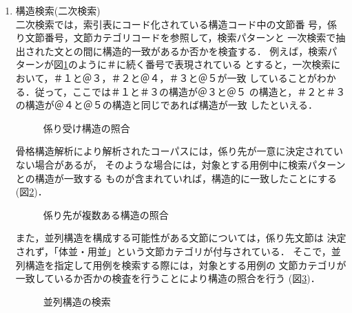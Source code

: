 \begin{enumerate}
\item{構造検索(二次検索)} \\
二次検索では，索引表にコード化されている構造コード中の文節番
号，係り文節番号，文節カテゴリコードを参照して，検索パターンと
一次検索で抽出された文との間に構造的一致があるか否かを検査する．
例えば，検索パターンが図\ref{struct}のように＃に続く番号で表現されている
とすると，一次検索において，＃１と＠３，＃２と＠４，＃３と＠５が一致
していることがわかる．従って，ここでは＃１と＃３の構造が＠３と＠５
の構造と，＃２と＃３の構造が＠４と＠５の構造と同じであれば構造が一致
したといえる．

\begin{figure}[htb]
\begin{center}
\vspace{-2mm}
  
\caption{係り受け構造の照合}
\vspace{-3mm}
\label{struct}
\end{center}
\end{figure}

骨格構造解析により解析されたコーパスには，係り先が一意に決定されていない場合があるが，
そのような場合には，対象とする用例中に検索パターンとの構造が一致する
ものが含まれていれば，構造的に一致したことにする(図\ref{aimai})．

\begin{figure}[htb]
\begin{center}
\vspace{-2mm}
  
\caption{係り先が複数ある構造の照合}
\vspace{-3mm}
\label{aimai}
\end{center}
\end{figure}

また，並列構造を構成する可能性がある文節については，係り先文節は
決定されず，「体並・用並」という文節カテゴリが付与されている．
そこで，並列構造を指定して用例を検索する際には，対象とする用例の
文節カテゴリが一致しているか否かの検査を行うことにより構造の照合を行う
(図\ref{para})．

\begin{figure}[htb]
\begin{center}
\vspace{-2mm}
\caption{並列構造の検索}
\vspace{-3mm}
\label{para}
\end{center}
\end{figure}
\end{enumerate}


